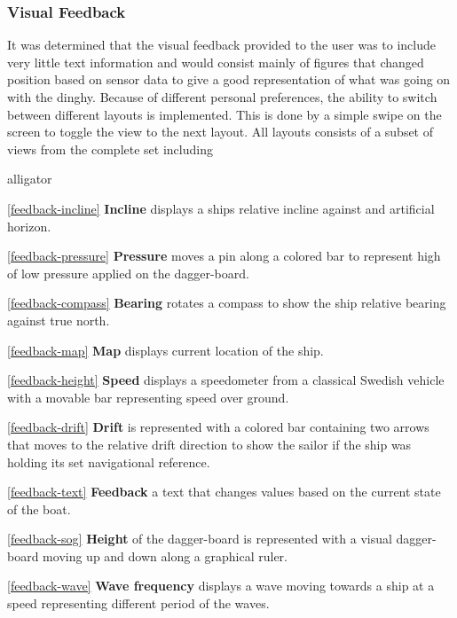 \subsubsection{Visual Feedback}
It was determined that the visual feedback provided to the user was to include very little text information and would consist mainly of figures that changed position based on sensor data to give a good representation of what was going on with the dinghy. Because of different personal preferences, the ability to switch between different layouts is implemented. This is done by a simple swipe on the screen to toggle the view to the next layout. All layouts consists of a subset of views from the complete set including
\begin{labeling}{alligator}
\item [\ref{feedback-incline} \textbf{Incline}]  displays a ships relative incline against and artificial horizon.
\item [\ref{feedback-pressure} \textbf{Pressure}] moves a pin along a colored bar to represent high of low pressure applied on the dagger-board.
\item [\ref{feedback-compass} \textbf{Bearing}] rotates a compass to show the ship relative bearing against true north.
\item [\ref{feedback-map} \textbf{Map}] displays current location of the ship.
\item [\ref{feedback-height} \textbf{Speed}] displays a speedometer from a classical Swedish vehicle\cite{volvo} with a movable bar representing speed over ground.
\item [\ref{feedback-drift} \textbf{Drift}] is represented with a colored bar containing two arrows that moves to the relative drift direction to show the sailor if the ship was holding its set navigational reference.
\item [\ref{feedback-text} \textbf{Feedback}] a text that changes values based on the current state of the boat.
\item [\ref{feedback-sog} \textbf{Height}] of the dagger-board is represented with a visual dagger-board moving up and down along a graphical ruler.
\item [\ref{feedback-wave} \textbf{Wave frequency}] displays a wave moving towards a ship at a speed representing different period of the waves.
\end{labeling}

